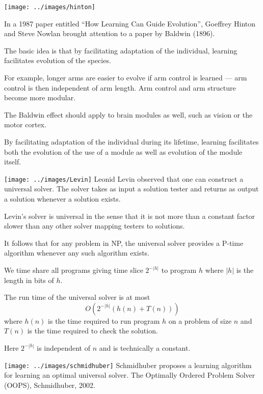 {\vfill
{}

\texttt{[image: ../images/hinton]}

In a 1987 paper entitled ``How Learning Can Guide Evolution'', Goeffrey Hinton and Steve Nowlan brought attention to a paper by Baldwin (1896).

\vfill
The basic idea is that by facilitating adaptation of the individual, learning facilitates evolution of the species.

\vfill
For example, longer arms are easier to evolve if arm control is learned --- arm control is then independent of arm length.  Arm control and arm structure become more modular.


The Baldwin effect should apply to brain modules as well, such as vision or the motor cortex.

\vfill
By facilitating adaptation of the individual during its lifetime, learning facilitates both the evolution of the use of a module as well
as evolution of the module itself.


\texttt{[image: ../images/Levin]}
Leonid Levin observed that one can construct a universal solver.  The solver takes as input a solution tester
and returns as output a solution whenever a solution exists.

  \vfill
Levin's solver is universal in the sense that it is not more than a constant factor slower than any other solver mapping testers to solutions.

\vfill
It follows that for any problem in NP, the universal solver provides a P-time algorithm whenever any such algorithm exists.


  
\vfill
We time share all programs giving time slice $2^{-|h|}$ to program $h$ where $|h|$
is the length in bits of $h$.

\vfill
The run time of the universal solver is at most
$$O(2^{-|h|}(h(n) + T(n)))$$
where $h(n)$ is the time required to run program $h$ on a problem of size $n$ and $T(n)$ is the time required to check the solution.

\vfill
Here $2^{-|h|}$ is independent of $n$ and is technically a constant.

\vfill
\texttt{[image: ../images/schmidhuber]}
Schmidhuber proposes a learning algorithm for learning an optimal universal solver.
The Optimally Ordered Problem Solver (OOPS), Schmidhuber, 2002.


}
